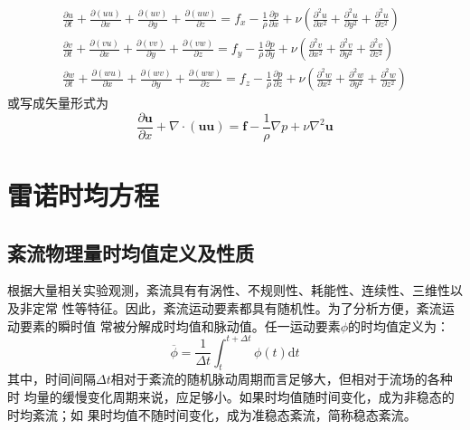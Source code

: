 \begin{subequations}
  \begin{align}
    \frac{\partial u}{\partial t}
    +
    \frac{\partial (uu)}{\partial x}
    +
    \frac{\partial (uv)}{\partial y}
    +
    \frac{\partial (uw)}{\partial z}
    =
    f_{x}
    -\frac{1}{\rho}\frac{\partial p}{\partial x}
    +
    \nu
    \left(
    \frac{\partial^{2} u}{\partial x^{2}} +
    \frac{\partial^{2} u}{\partial y^{2}} +
    \frac{\partial^{2} u}{\partial z^{2}}
    \right)
    \label{EqCGe_NS_Me_x}
    \\
    \frac{\partial v}{\partial t}
    +
    \frac{\partial (vu)}{\partial x}
    +
    \frac{\partial (vv)}{\partial y}
    +
    \frac{\partial (vw)}{\partial z}
    =
    f_{y}
    -\frac{1}{\rho}\frac{\partial p}{\partial y}
    +
    \nu
    \left(
    \frac{\partial^{2} v}{\partial x^{2}} +
    \frac{\partial^{2} v}{\partial y^{2}} +
    \frac{\partial^{2} v}{\partial z^{2}}
    \right)
    \\
    \frac{\partial w}{\partial t}
    +
    \frac{\partial (wu)}{\partial x}
    +
    \frac{\partial (wv)}{\partial y}
    +
    \frac{\partial (ww)}{\partial z}
    =
    f_{z}
    -\frac{1}{\rho}\frac{\partial p}{\partial z}
    +
    \nu
    \left(
    \frac{\partial^{2} w}{\partial x^{2}} +
    \frac{\partial^{2} w}{\partial y^{2}} +
    \frac{\partial^{2} w}{\partial z^{2}}
    \right)
  \end{align}
  \label{EqCGe_NS_Me}
\end{subequations}
或写成矢量形式为
\begin{equation}
  \frac{\partial \mathbf{u}}{\partial x} +
  \nabla\cdot(\mathbf{u}\mathbf{u})
  =
  \mathbf{f} -
  \frac{1}{\rho}\nabla p +
  \nu\nabla^{2}\mathbf{u}
\end{equation}


\section{雷诺时均方程}
\subsection{紊流物理量时均值定义及性质}
根据大量相关实验观测，紊流具有有涡性、不规则性、耗能性、连续性、三维性以及非定常
性等特征。因此，紊流运动要素都具有随机性。为了分析方便，紊流运动要素的瞬时值
常被分解成时均值和脉动值。任一运动要素$\phi$的时均值定义为：
\begin{equation}
  \overline{\phi}
  =
  \frac{1}{\Delta t}
  \int_{t}^{t+\Delta t}\!
  \phi(t)
  \mathrm{d}t
  \label{EqCGe_RA}
\end{equation}
其中，时间间隔$\Delta t$相对于紊流的随机脉动周期而言足够大，但相对于流场的各种时
均量的缓慢变化周期来说，应足够小。如果时均值随时间变化，成为非稳态的时均紊流；如
果时均值不随时间变化，成为准稳态紊流，简称稳态紊流。


